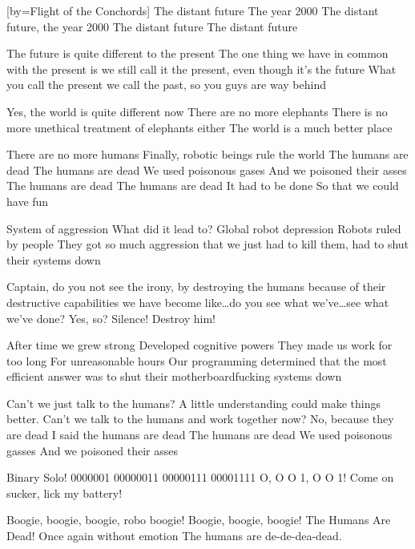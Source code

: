 [by={Flight of the Conchords}]
\beginverse
The distant future
The year 2000
The distant future, the year 2000
The distant future
The distant future
\endverse

\beginverse
The future is quite different to the present
The one thing we have in common with the present is we still call it the present, even though it's the future
What you call the present we call the past, so you guys are way behind
\endverse

\beginverse
Yes, the world is quite different now
There are no more elephants
There is no more unethical treatment of elephants either
The world is a much better place
\endverse

\beginchorus
There are no more humans
Finally, robotic beings rule the world
The humans are dead
The humans are dead
We used poisonous gases
And we poisoned their asses
The humans are dead 
The humans are dead 
It had to be done 
So that we could have fun 
\endchorus

\beginverse
System of aggression
What did it lead to?
Global robot depression
Robots ruled by people
They got so much aggression that we just had to kill them, had to shut their systems down
\endverse

\beginverse
Captain, do you not see the irony, by destroying the humans because of their destructive capabilities we have become like\dots do you see what we've\dots see what we've done?
Yes, so?
Silence! Destroy him!
\endverse

\beginverse
After time we grew strong
Developed cognitive powers
They made us work for too long
For unreasonable hours
Our programming determined that the most efficient answer was to shut their motherboardfucking systems down
\endverse

\beginchorus
Can't we just talk to the humans?
A little understanding could make things better.
Can't we talk to the humans and work together now?
No, because they are dead
I said the humans are dead 
The humans are dead 
We used poisonous gasses 
And we poisoned their asses 
\endchorus

\beginverse
Binary Solo!
0000001
00000011
00000111
00001111
O, O O 1, O O 1!
Come on sucker, lick my battery!
\endverse

\beginverse
Boogie, boogie, boogie, robo boogie!
Boogie, boogie, boogie!
The Humans Are Dead!
Once again without emotion
The humans are de-de-dea-dead.
\endverse
\endsong